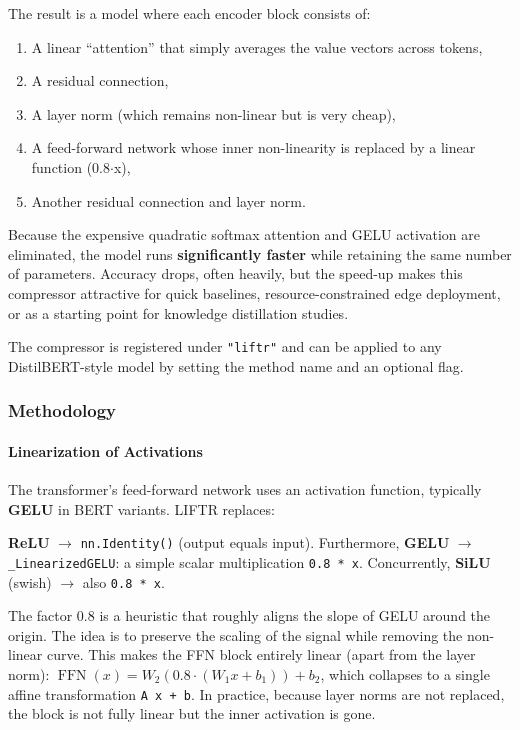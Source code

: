 The result is a model where each encoder block consists of:
\begin{enumerate}
\item A linear ``attention'' that simply averages the value vectors across tokens,
\item A residual connection,
\item A layer norm (which remains non-linear but is very cheap),
\item A feed-forward network whose inner non-linearity is replaced by a linear function (0.8$\cdot$x),
\item Another residual connection and layer norm.

\end{enumerate}
Because the expensive quadratic softmax attention and GELU activation are eliminated, the model runs \textbf{significantly faster} while retaining the same number of parameters. Accuracy drops, often heavily, but the speed-up makes this compressor attractive for quick baselines, resource-constrained edge deployment, or as a starting point for knowledge distillation studies.

The compressor is registered under \texttt{"liftr"} and can be applied to any DistilBERT-style model by setting the method name and an optional flag.


\subsubsection*{Methodology}

\paragraph{Linearization of Activations}

The transformer's feed-forward network uses an activation function, typically \textbf{GELU} in BERT variants. LIFTR replaces:

\textbf{ReLU} $\rightarrow$ \texttt{nn.Identity()} (output equals input). Furthermore, \textbf{GELU} $\rightarrow$ \texttt{\_LinearizedGELU}: a simple scalar multiplication \texttt{0.8 * x}. Concurrently, \textbf{SiLU} (swish) $\rightarrow$ also \texttt{0.8 * x}.


The factor 0.8 is a heuristic that roughly aligns the slope of GELU around the origin. The idea is to preserve the scaling of the signal while removing the non-linear curve. This makes the FFN block entirely linear (apart from the layer norm): $\operatorname{FFN}(x) = W_2 (0.8 \cdot (W_1 x + b_1)) + b_2$, which collapses to a single affine transformation \texttt{A x + b}. In practice, because layer norms are not replaced, the block is not fully linear but the inner activation is gone.

